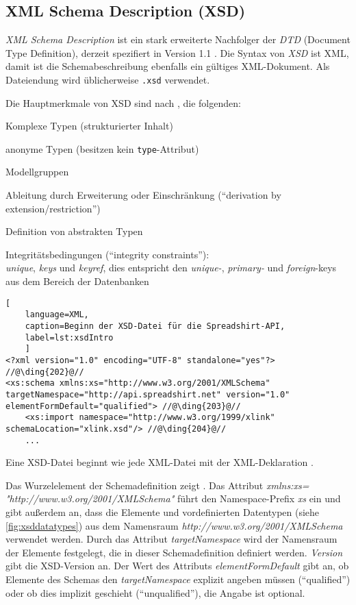 \subsection{XML Schema Description (XSD)}
\label{sec:xsd}

\emph{XML Schema Description} ist ein stark erweiterte Nachfolger der \emph{DTD} (Document Type Definition), derzeit spezifiert in Version 1.1 \cite{XMLSchema11Specification}. 
Die Syntax von \emph{XSD} ist XML, damit ist die Schemabeschreibung ebenfalls ein gültiges XML-Dokument. Als Dateiendung wird üblicherweise \texttt{.xsd} verwendet.

Die Hauptmerkmale von XSD sind nach \cite[Kapitel 3.2][]{taxonomyXMLSchema}
, die folgenden:
\begin{compactitem}
    \item Komplexe Typen (strukturierter Inhalt)
    \item anonyme Typen (besitzen kein \texttt{type}-Attribut)
    \item Modellgruppen
    \item Ableitung durch Erweiterung oder Einschränkung (\enquote{derivation by extension/restriction})
    \item Definition von abstrakten Typen
    \item Integritätsbedingungen (\enquote{integrity constraints}):\\
        \emph{unique}, \emph{keys} und \emph{keyref}, dies entspricht den \emph{unique-}, \emph{primary-} und \emph{foreign}-keys aus dem Bereich der Datenbanken        
\end{compactitem}

\begin{lstlisting}[
    language=XML,
    caption=Beginn der XSD-Datei für die Spreadshirt-API,
    label=lst:xsdIntro
    ]
<?xml version="1.0" encoding="UTF-8" standalone="yes"?> //@\ding{202}@//
<xs:schema xmlns:xs="http://www.w3.org/2001/XMLSchema"  targetNamespace="http://api.spreadshirt.net" version="1.0" elementFormDefault="qualified"> //@\ding{203}@//
    <xs:import namespace="http://www.w3.org/1999/xlink" schemaLocation="xlink.xsd"/> //@\ding{204}@//
    ...
\end{lstlisting}

Eine XSD-Datei beginnt wie jede XML-Datei mit der XML-Deklaration .

Das Wurzelelement der Schemadefinition zeigt . 
Das Attribut \emph{xmlns:xs= "http://www.w3.org/2001/XMLSchema"} führt den Namespace-Prefix \emph{xs} ein und gibt außerdem an, dass die Elemente und vordefinierten Datentypen (siehe \cref{fig:xsddatatypes}) aus dem Namensraum \emph{http://www.w3.org/2001/XMLSchema} verwendet werden. Durch das Attribut \emph{targetNamespace} wird der Namensraum der Elemente festgelegt, die in dieser Schemadefinition definiert werden. \emph{Version} gibt die XSD-Version an.
Der Wert des Attributs \emph{elementFormDefault} gibt an, ob Elemente des Schemas den \emph{targetNamespace} explizit angeben müssen (\enquote{qualified}) oder ob dies implizit geschieht (\enquote{unqualified}), die Angabe ist optional.

